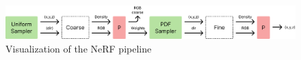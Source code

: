 \begin{figure}
    \centering
    \includegraphics[width=1.0\textwidth]{figures/NeRF_Pipeline.png}
    \caption{Visualization of the NeRF pipeline}
    \label{fig:nerf-pipeline}
\end{figure}